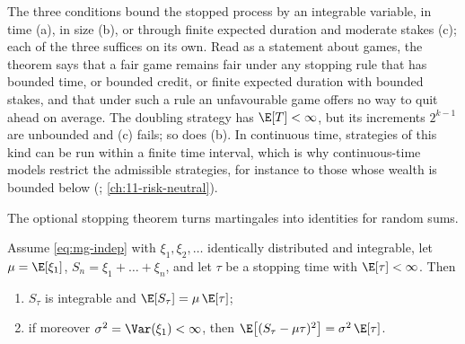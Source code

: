 The three conditions bound the stopped process by an integrable variable, in time (a), in
size (b), or through finite expected duration and moderate stakes (c); each of the three
suffices on its own. Read as a statement about games, the theorem says that a fair game
remains fair under any stopping rule that has bounded time, or bounded credit, or finite
expected duration with bounded stakes, and that under such a rule an unfavourable game
offers no way to quit ahead on average. The doubling strategy has
$\E[T]<\infty$, but its increments $2^{k-1}$ are unbounded and (c) fails; so does (b). In
continuous time, strategies of this kind can be run within a finite time interval, which is
why continuous-time models restrict the admissible strategies, for instance to those whose
wealth is bounded below (\textcite{harrison-pliska}; \cref{ch:11-risk-neutral}).

The optional stopping theorem turns martingales into identities for random sums.

\begin{proposition}\label{prop:mg-wald}
Assume \eqref{eq:mg-indep} with $\xi_1,\xi_2,\dots$ identically distributed and
integrable, let $\mu=\E[\xi_1]$, $S_n=\xi_1+\dots+\xi_n$, and let $\tau$ be a stopping time
with $\E[\tau]<\infty$. Then
\begin{enumerate}[label=(\roman*)]
  \item $S_\tau$ is integrable and $\E[S_\tau]=\mu\,\E[\tau]$;
  \item if moreover $\sigma^2=\Var(\xi_1)<\infty$, then $\E\big[(S_\tau-\mu\tau)^2\big]=\sigma^2\,\E[\tau]$.
\end{enumerate}
\end{proposition}

